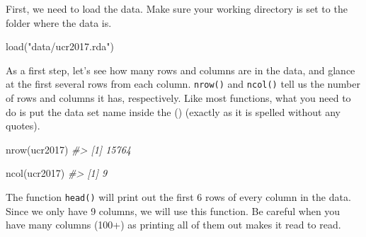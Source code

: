 \documentclass[
]{krantz}
\makeatletter
\newenvironment{Shaded}{\begin{snugshade}}{\end{snugshade}}
\newcommand{\CommentTok}[1]{\textcolor[rgb]{0.37,0.37,0.37}{\textit{#1}}}
\newcommand{\FunctionTok}[1]{\textcolor[rgb]{0,0,0}{#1}}
\newcommand{\NormalTok}[1]{#1}
\newcommand{\StringTok}[1]{\textcolor[rgb]{0.5,0.5,0.5}{#1}}
\newenvironment{kframe}{%
\medskip{}
\setlength{\fboxsep}{.8em}
 \def\at@end@of@kframe{}%
 \ifinner\ifhmode%
  \def\at@end@of@kframe{\end{minipage}}%
  \begin{minipage}{\columnwidth}%
 \fi\fi%
 \def\FrameCommand##1{\hskip\@totalleftmargin \hskip-\fboxsep
 \colorbox{shadecolor}{##1}\hskip-\fboxsep
     \hskip-\linewidth \hskip-\@totalleftmargin \hskip\columnwidth}%
 \MakeFramed {\advance\hsize-\width
   \@totalleftmargin\z@ \linewidth\hsize
   \@setminipage}}%
 {\par\unskip\endMakeFramed%
 \at@end@of@kframe}
\renewenvironment{Shaded}{\begin{kframe}}{\end{kframe}}
\makeatother
\begin{document}
First, we need to load the data. Make sure your working directory is set to the folder where the data is.

\begin{Shaded}
\begin{Highlighting}[]
\FunctionTok{load}\NormalTok{(}\StringTok{"data/ucr2017.rda"}\NormalTok{)}
\end{Highlighting}
\end{Shaded}

As a first step, let's see how many rows and columns are in the data, and glance at the first several rows from each column. \texttt{nrow()} and \texttt{ncol()} tell us the number of rows and columns it has, respectively. Like most functions, what you need to do is put the data set name inside the () (exactly as it is spelled without any quotes).

\begin{Shaded}
\begin{Highlighting}[]
\FunctionTok{nrow}\NormalTok{(ucr2017)}
\CommentTok{\#\textgreater{} [1] 15764}
\end{Highlighting}
\end{Shaded}

\begin{Shaded}
\begin{Highlighting}[]
\FunctionTok{ncol}\NormalTok{(ucr2017)}
\CommentTok{\#\textgreater{} [1] 9}
\end{Highlighting}
\end{Shaded}

The function \texttt{head()} will print out the first 6 rows of every column in the data. Since we only have 9 columns, we will use this function. Be careful when you have many columns (100+) as printing all of them out makes it read to read.
\end{document}
